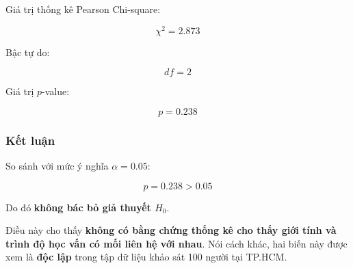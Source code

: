 Giá trị thống kê Pearson Chi-square:

\[
\chi^2 = 2.873
\]

Bậc tự do:

\[
df = 2
\]

Giá trị $p$-value:

\[
p = 0.238
\]

\subsubsection{Kết luận}

So sánh với mức ý nghĩa $\alpha = 0.05$:

\[
p = 0.238 > 0.05
\]

Do đó \textbf{không bác bỏ giả thuyết $H_0$}.

Điều này cho thấy \textbf{không có bằng chứng thống kê cho thấy
giới tính và trình độ học vấn có mối liên hệ với nhau}.
Nói cách khác, hai biến này được xem là \textbf{độc lập} trong
tập dữ liệu khảo sát 100 người tại TP.HCM.